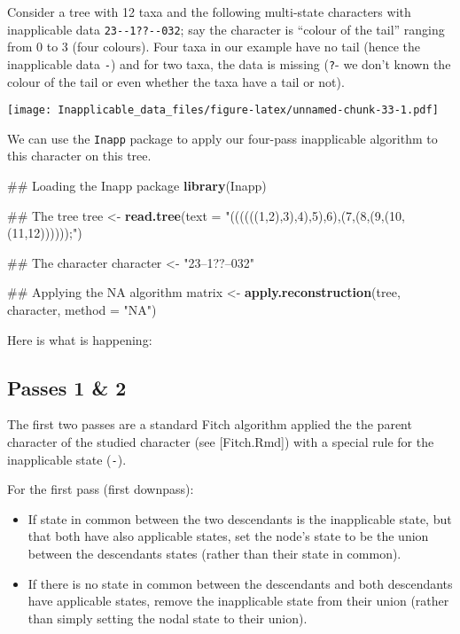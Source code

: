 \documentclass[]{book}
\newenvironment{Shaded}{\begin{snugshade}}{\end{snugshade}}
\newcommand{\KeywordTok}[1]{\textcolor[rgb]{0.13,0.29,0.53}{\textbf{#1}}}
\newcommand{\DataTypeTok}[1]{\textcolor[rgb]{0.13,0.29,0.53}{#1}}
\newcommand{\StringTok}[1]{\textcolor[rgb]{0.31,0.60,0.02}{#1}}
\newcommand{\NormalTok}[1]{#1}
\providecommand{\tightlist}{%
  \setlength{\itemsep}{0pt}\setlength{\parskip}{0pt}}
\theoremstyle{definition}
\theoremstyle{definition}
\theoremstyle{definition}
\theoremstyle{remark}
\begin{document}
Consider a tree with 12 taxa and the following multi-state characters
with inapplicable data \texttt{23-\/-1??-\/-032}; say the character is
``colour of the tail'' ranging from 0 to 3 (four colours). Four taxa in
our example have no tail (hence the inapplicable data \texttt{-}) and
for two taxa, the data is missing (\texttt{?}- we don't known the colour
of the tail or even whether the taxa have a tail or not).

\texttt{[image: Inapplicable\_data\_files/figure-latex/unnamed-chunk-33-1.pdf]}

We can use the \texttt{Inapp} package to apply our four-pass
inapplicable algorithm to this character on this tree.

\begin{Shaded}
\begin{Highlighting}[]
\NormalTok{## Loading the Inapp package}
\KeywordTok{library}\NormalTok{(Inapp)}

\NormalTok{## The tree}
\NormalTok{tree <-}\StringTok{ }\KeywordTok{read.tree}\NormalTok{(}\DataTypeTok{text =} \StringTok{"((((((1,2),3),4),5),6),(7,(8,(9,(10,(11,12))))));"}\NormalTok{)}

\NormalTok{## The character}
\NormalTok{character <-}\StringTok{ "23--1??--032"}

\NormalTok{## Applying the NA algorithm}
\NormalTok{matrix <-}\StringTok{ }\KeywordTok{apply.reconstruction}\NormalTok{(tree, character, }\DataTypeTok{method =} \StringTok{"NA"}\NormalTok{)}
\end{Highlighting}
\end{Shaded}

Here is what is happening:

\hypertarget{passes-1-2}{%
\subsection{Passes 1 \& 2}\label{passes-1-2}}

The first two passes are a standard Fitch algorithm applied the the
parent character of the studied character (see {[}Fitch.Rmd{]}) with a
special rule for the inapplicable state (\texttt{-}).

For the first pass (first downpass):

\begin{itemize}
\tightlist
\item
  If state in common between the two descendants is the inapplicable
  state, but that both have also applicable states, set the node's state
  to be the union between the descendants states (rather than their
  state in common).
\item
  If there is no state in common between the descendants and both
  descendants have applicable states, remove the inapplicable state from
  their union (rather than simply setting the nodal state to their
  union).
\end{itemize}
\end{document}
